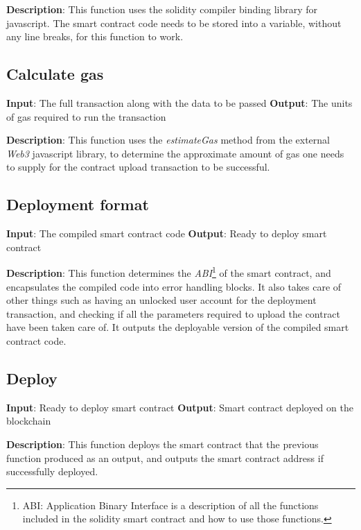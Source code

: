 \documentclass[english]{tktltiki}
\begin{document}
\textbf{Description}: This function uses the solidity compiler binding library for javascript. The smart contract code needs to be stored into a variable, without any line breaks, for this function to work. 

\subsection*{Calculate gas}
\textbf{Input}: The full transaction along with the data to be passed \newline
\textbf{Output}: The units of gas required to run the transaction\newline

\textbf{Description}: This function uses the \textit{estimateGas} method from the external \textit{Web3} javascript library, to determine the approximate amount of gas one needs to supply for the contract upload transaction to be successful.

\subsection*{Deployment format}
\textbf{Input}: The compiled smart contract code\newline
\textbf{Output}: Ready to deploy smart contract\newline

\textbf{Description}:
This function determines the \textit{ABI}\footnote{ABI: Application Binary Interface is a description of all the functions included in the solidity smart contract and how to use those functions.} of the smart contract, and encapsulates the compiled code into error handling blocks. It also takes care of other things such as having an unlocked user account for the deployment transaction, and checking if all the parameters required to upload the contract have been taken care of. It outputs the deployable version of the compiled smart contract code.
\subsection*{Deploy}
\textbf{Input}: Ready to deploy smart contract \newline
\textbf{Output}: Smart contract deployed on the blockchain\newline

\textbf{Description}:
This function deploys the smart contract that the previous function produced as an output, and outputs the smart contract address if successfully deployed.
\end{document}
